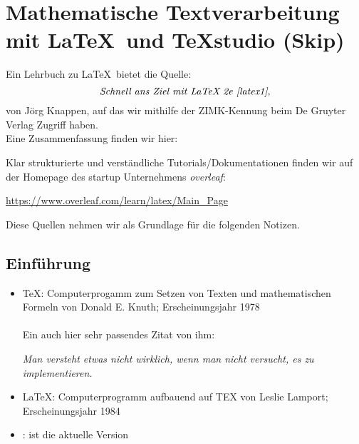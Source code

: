 \section{Mathematische Textverarbeitung mit \LaTeX~und TeXstudio (Skip)}
Ein Lehrbuch zu \LaTeX~bietet die Quelle:
$$\textit{Schnell ans Ziel mit LaTeX 2e \cite{latex1}},$$
von Jörg Knappen, auf das wir mithilfe der ZIMK-Kennung beim De Gruyter Verlag Zugriff haben.\\
Eine Zusammenfassung finden wir hier:
\begin{center}
\end{center}
Klar strukturierte und verständliche Tutorials/Dokumentationen finden wir auf der Homepage des startup Unternehmens \textit{overleaf}:
\begin{center}
	\url{https://www.overleaf.com/learn/latex/Main_Page}
\end{center}
Diese Quellen nehmen wir als Grundlage für die folgenden Notizen.\\


\subsection{Einführung}
\begin{itemize}
	\item \TeX: Computerprogamm zum Setzen von Texten und mathematischen Formeln von Donald E. Knuth; Erscheinungsjahr 1978\\~\\
	Ein auch hier sehr passendes Zitat von ihm:
	\begin{center}
	\textit{	Man versteht etwas nicht wirklich, wenn man nicht versucht, es zu implementieren.}
	\end{center}

\item \LaTeX: Computerprogramm aufbauend auf TEX von Leslie Lamport; Erscheinungsjahr 1984
\item \LaTeXe: ist die aktuelle Version
\end{itemize}

